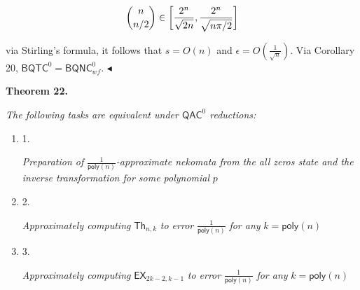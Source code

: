 \documentclass[10pt,a4paper]{article}
\begin{document}
\[\begin{gathered}
\displaystyle\dbinom{n}{n/2}\in\bigg{[}\frac{2^{n}}{\sqrt{2n}},\frac{2^{n}}{\sqrt{n\pi/2}}\bigg{]}
\end{gathered}\]


via Stirling’s formula, it follows that $s=O(n)$ and $\epsilon=O(\frac{1}{\sqrt{n}})$. Via Corollary 20, ${\mathsf{BQTC}}^{0}={\mathsf{BQNC}}^{0}_{wf}$.
$\blacktriangleleft$\par





\par\medskip\noindent\textbf{
\textbf{Theorem 22}\textbf{.}
}\par



\emph{The following tasks are equivalent under ${\mathsf{QAC}}^{0}$ reductions:}\par


\begin{enumerate}


\item[] 
1. 


\emph{Preparation of }$\frac{1}{{\mathsf{poly}}(n)}$\emph{-approximate nekomata from the all zeros state and the inverse transformation for some polynomial }$p$\emph{}\par





\item[] 
2. 


\emph{Approximately computing }$\mathsf{Th}_{n,k}$\emph{ to error }$\frac{1}{{\mathsf{poly}}(n)}$\emph{ for any }$k={\mathsf{poly}}(n)$\emph{}\par





\item[] 
3. 


\emph{Approximately computing }$\mathsf{EX}_{2k-2,k-1}$\emph{ to error }$\frac{1}{{\mathsf{poly}}(n)}$\emph{ for any }$k={\mathsf{poly}}(n)$\emph{}\par





\end{enumerate}



\end{document}
